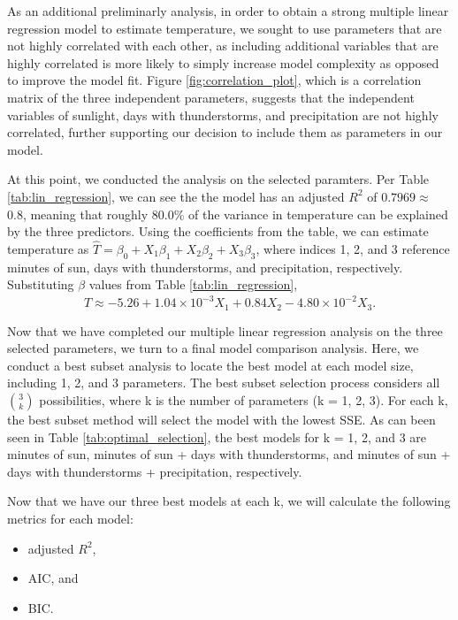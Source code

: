 As an additional preliminarly analysis, in order to obtain a strong multiple linear regression model to estimate temperature, we sought to use parameters that are not highly correlated with each other, as including additional variables that are highly correlated is more likely to simply increase model complexity as opposed to improve the model fit. Figure \ref{fig:correlation_plot}, which is a correlation matrix of the three independent parameters, suggests that the independent variables of sunlight, days with thunderstorms, and precipitation are not highly correlated, further supporting our decision to include them as parameters in our model.

At this point, we conducted the analysis on the selected paramters. Per Table \ref{tab:lin_regression}, we can see the the model has an adjusted $R^{2}$ of $0.7969 \approx$ 0.8, meaning that roughly 80.0\% of the variance in temperature can be explained by the three predictors. Using the coefficients from the table, we can estimate temperature as $\hat{T} = \beta_{0} + X_{1}\beta_{1} + X_{2}\beta_{2} + X_{3}\beta_{3}$, where indices 1, 2, and 3 reference minutes of sun, days with thunderstorms, and precipitation, respectively. Substituting $\beta$ values from Table \ref{tab:lin_regression}, $$\hat{T} \approx -5.26 + 1.04 \times 10^{-3}X_{1} + 0.84X_{2} - 4.80\times 10^{-2}X_{3}.$$

Now that we have completed our multiple linear regression analysis on the three selected parameters, we turn to a final model comparison analysis. Here, we conduct a best subset analysis to locate the best model at each model size, including 1, 2, and 3 parameters. The best subset selection process considers all $3 \choose k$ possibilities, where k is the number of parameters (k = 1, 2, 3). For each k, the best subset method will select the model with the lowest SSE. As can been seen in Table \ref{tab:optimal_selection}, the best models for k = 1, 2, and 3 are minutes of sun, minutes of sun + days with thunderstorms, and minutes of sun + days with thunderstorms + precipitation, respectively.

Now that we have our three best models at each k, we will calculate the following metrics for each model: 

\begin{itemize}
	\item adjusted $R^{2}$,
	\item AIC, and
	\item BIC.
\end{itemize}

